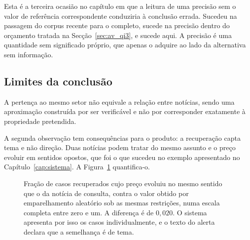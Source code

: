 Esta é a terceira ocasião no capítulo em que a leitura de uma precisão sem o valor de referência
correspondente conduziria à conclusão errada. Sucedeu na passagem do corpus recente para o completo,
sucede na precisão dentro do orçamento tratada na Secção~\ref{sec:av_qi3}, e sucede aqui. A precisão
é uma quantidade sem significado próprio, que apenas o adquire ao lado da alternativa sem informação.

\subsection{Limites da conclusão}

A pertença ao mesmo setor não equivale a relação entre notícias, sendo uma aproximação construída por
ser verificável e não por corresponder exatamente à propriedade pretendida.

A segunda observação tem consequências para o produto: a recuperação capta tema e não direção. Duas
notícias podem tratar do mesmo assunto e o preço evoluir em sentidos opostos, que foi o que sucedeu
no exemplo apresentado no Capítulo~\ref{cap:sistema}. A Figura~\ref{fig:av_direcao} quantifica-o.

\begin{figure}[ht]
\centering
{}
\caption[Tema e direção não são a mesma propriedade]{Fração de casos recuperados cujo preço evoluiu
no mesmo sentido que o da notícia de consulta, contra o valor obtido por emparelhamento aleatório sob
as mesmas restrições, numa escala completa entre zero e um. A diferença é de $0{,}020$. O sistema apresenta por isso os casos
individualmente, e o texto do alerta declara que a semelhança é de tema.}
\label{fig:av_direcao}
\end{figure}

